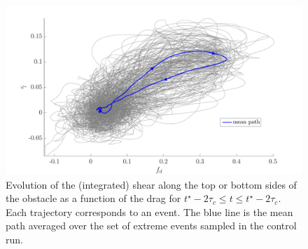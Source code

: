 \documentclass[pre,aps,floatfix,10pt,superscriptaddress, notitlepage,preprint]{revtex4-1}
\begin{document}

\begin{figure}
	\centering
	\includegraphics[width=.7\linewidth]{shear_asof_drag/shear_asof_drag}
	\caption{\label{fig:shear_asof_drag} Evolution of the (integrated) shear along the top or bottom sides of the obstacle as a function of the drag for $t^{\star}-2\tau_c \leq t \leq t^{\star}-2\tau_c$. Each trajectory corresponds to an event. The blue line is the mean path averaged over the set of extreme events sampled in the control run.}
\end{figure}
\end{document}
